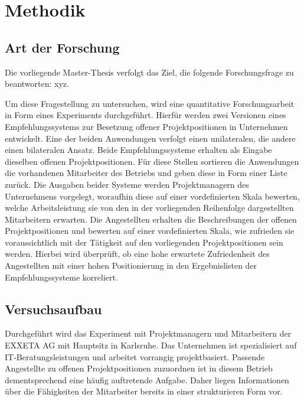 \chapter{Methodik}
\label{ch:methodik}

\section{Art der Forschung}
\label{ch:methodik:art}
Die vorliegende Master-Thesis verfolgt das Ziel, die folgende Forschungsfrage zu beantworten: xyz.

Um diese Fragestellung zu untersuchen, wird eine quantitative Forschungsarbeit in Form eines Experiments durchgeführt. Hierfür werden zwei Versionen eines Empfehlungssystems zur Besetzung offener Projektpositionen in Unternehmen entwickelt. Eine der beiden Anwendungen verfolgt einen unilateralen, die andere einen bilateralen Ansatz. Beide Empfehlungssysteme erhalten als Eingabe dieselben offenen Projektpositionen. Für diese Stellen sortieren die Anwendungen die vorhandenen Mitarbeiter des Betriebs und geben diese in Form einer Liste zurück. Die Ausgaben beider Systeme werden Projektmanagern des Unternehmens vorgelegt, woraufhin diese auf einer vordefinierten Skala bewerten, welche Arbeitsleistung sie von den in der vorliegenden Reihenfolge dargestellten Mitarbeitern erwarten. Die Angestellten erhalten die Beschreibungen der offenen Projektpositionen und bewerten auf einer vordefinierten Skala, wie zufrieden sie voraussichtlich mit der Tätigkeit auf den vorliegenden Projektpositionen sein werden. Hierbei wird überprüft, ob eine hohe erwartete Zufriedenheit des Angestellten mit einer hohen Positionierung in den Ergebnislisten der Empfehlungssysteme korreliert.

\section{Versuchsaufbau}
\label{ch:methodik:versuchsaufbau}
Durchgeführt wird das Experiment mit Projektmanagern und Mitarbeitern der EXXETA AG mit Hauptsitz in Karlsruhe. Das Unternehmen ist spezialisiert auf IT-Beratungsleistungen und arbeitet vorrangig projektbasiert. Passende Angestellte zu offenen Projektpositionen zuzuordnen ist in diesem Betrieb dementsprechend eine häufig auftretende Aufgabe. Daher liegen Informationen über die Fähigkeiten der Mitarbeiter bereits in einer strukturieren Form vor.

